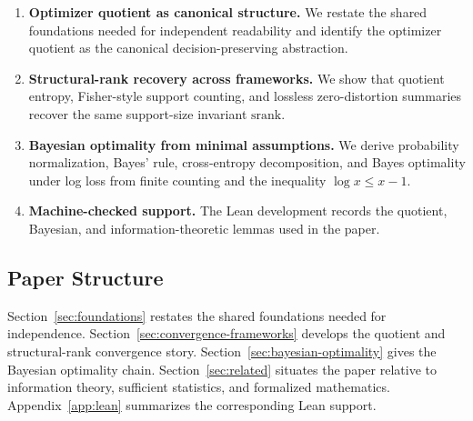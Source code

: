 \begin{enumerate}
\item \textbf{Optimizer quotient as canonical structure.} We restate the shared foundations needed for independent readability and identify the optimizer quotient as the canonical decision-preserving abstraction.

\item \textbf{Structural-rank recovery across frameworks.} We show that quotient entropy, Fisher-style support counting, and lossless zero-distortion summaries recover the same support-size invariant $\mathrm{srank}$.

\item \textbf{Bayesian optimality from minimal assumptions.} We derive probability normalization, Bayes' rule, cross-entropy decomposition, and Bayes optimality under log loss from finite counting and the inequality $\log x \le x - 1$.

\item \textbf{Machine-checked support.} The Lean development records the quotient, Bayesian, and information-theoretic lemmas used in the paper.
\end{enumerate}

\subsection{Paper Structure}

Section~\ref{sec:foundations} restates the shared foundations needed for independence. Section~\ref{sec:convergence-frameworks} develops the quotient and structural-rank convergence story. Section~\ref{sec:bayesian-optimality} gives the Bayesian optimality chain. Section~\ref{sec:related} situates the paper relative to information theory, sufficient statistics, and formalized mathematics. Appendix~\ref{app:lean} summarizes the corresponding Lean support.
